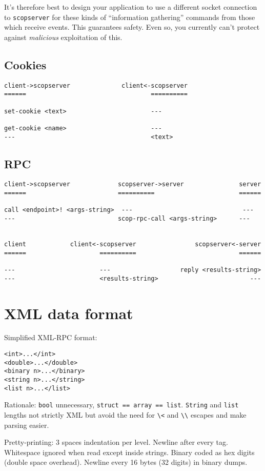 \documentclass[12pt,a4paper,twoside]{article}
\renewcommand{\_}{\texttt{\symbol{95}}}
\begin{document}
It's therefore best to design your application to use a different
socket connection to \texttt{scopserver} for these kinds of
``information gathering'' commands from those which receive events.
This guarantees safety. Even so, you currently can't protect against
\textit{malicious} exploitation of this.

\subsection{Cookies}

\begin{verbatim}
client->scopserver              client<-scopserver
======                                  ==========

set-cookie <text>                       ---

get-cookie <name>                       ---
---                                     <text>
\end{verbatim}

\subsection{RPC}

\begin{verbatim}
client->scopserver             scopserver->server               server
======                         ==========                       ======

call <endpoint>! <args-string>  ---                              ---
---                            scop-rpc-call <args-string>      ---


client            client<-scopserver                scopserver<-server
======                    ==========                            ======

---                       ---                   reply <results-string>
---                       <results-string>                         ---
\end{verbatim}

\section{XML data format}

Simplified XML-RPC format:

\begin{verbatim}
<int>...</int>
<double>...</double>
<binary n>...</binary>
<string n>...</string>
<list n>...</list>
\end{verbatim}

Rationale: \texttt{bool} unnecessary, \texttt{struct == array == list}.
\texttt{String} and \texttt{list} lengths not strictly XML but avoid the need
for \verb"\<" and \verb"\\" escapes and make parsing easier.

Pretty-printing: 3 spaces indentation per level. Newline after
every tag. Whitespace ignored when read except inside strings.
Binary coded as hex digits (double space overhead).
Newline every 16 bytes (32 digits) in binary dumps.
\end{document}

